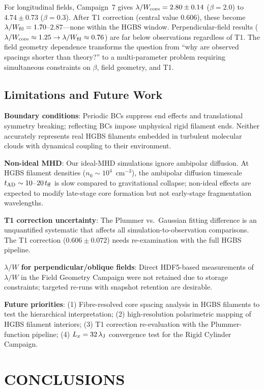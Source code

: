 \documentclass[twoside,twocolumn]{mnras}
\begin{document}
For longitudinal fields, Campaign~7 gives $\lambda/W_{\rm core} = 2.80 \pm 0.14$
($\beta = 2.0$) to $4.74 \pm 0.73$ ($\beta = 0.3$). After T1 correction (central
value 0.606), these become $\lambda/W_{\rm fil} = 1.70$--$2.87$---none within the
HGBS window. Perpendicular-field results ($\lambda/W_{\rm core} \approx 1.25 \to
\lambda/W_{\rm fil} \approx 0.76$) are far below observations regardless of T1.
The field geometry dependence transforms the question from ``why are observed spacings
shorter than theory?'' to a multi-parameter problem requiring simultaneous constraints
on $\beta$, field geometry, and T1.

\subsection{Limitations and Future Work}

\textbf{Boundary conditions}: Periodic BCs suppress end effects and translational
symmetry breaking; reflecting BCs impose unphysical rigid filament ends. Neither
accurately represents real HGBS filaments embedded in turbulent molecular clouds with
dynamical coupling to their environment.

\textbf{Non-ideal MHD}: Our ideal-MHD simulations ignore ambipolar diffusion. At HGBS
filament densities ($n_0 \sim 10^4$~cm$^{-3}$), the ambipolar diffusion timescale
$t_{\rm AD} \sim 10$--$20\,t_{\rm ff}$ is slow compared to gravitational collapse;
non-ideal effects are expected to modify late-stage core formation but not early-stage
fragmentation wavelengths.

\textbf{T1 correction uncertainty}: The Plummer vs.\ Gaussian fitting difference is an
unquantified systematic that affects all simulation-to-observation comparisons. The
T1 correction ($0.606 \pm 0.072$) needs re-examination with the full HGBS pipeline.

\textbf{$\lambda/W$ for perpendicular/oblique fields}: Direct HDF5-based measurements
of $\lambda/W$ in the Field Geometry Campaign were not retained due to storage constraints;
targeted re-runs with snapshot retention are desirable.

\textbf{Future priorities}: (1) Fibre-resolved core spacing analysis in HGBS filaments
to test the hierarchical interpretation; (2) high-resolution polarimetric mapping of
HGBS filament interiors; (3) T1 correction re-evaluation with the Plummer-function
pipeline; (4) $L_x = 32\,\lambda_{\rm J}$ convergence test for the Rigid Cylinder Campaign.

\section{CONCLUSIONS}
\end{document}
